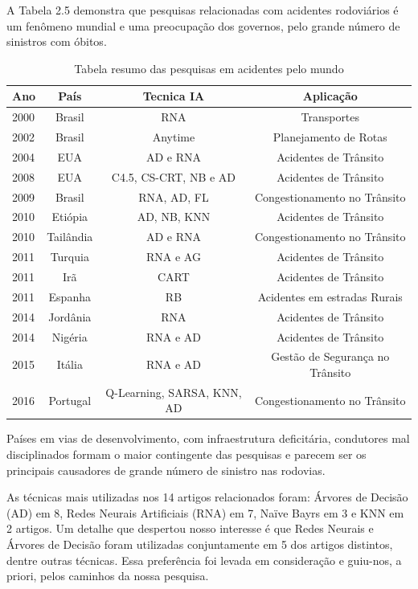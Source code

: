 \pagebreak

A Tabela 2.5 demonstra que pesquisas relacionadas com acidentes rodoviários é um fenômeno mundial e uma preocupação dos governos, pelo grande número de sinistros com  óbitos.

\begin{table}[!ht]
	\centering
	\caption{Tabela resumo das pesquisas em acidentes pelo mundo}
	\vspace{1mm}
	\begin{tabular}{l|c|c|c}
		\hline
		\textbf{Ano} & \textbf{País} & \textbf{Tecnica IA} & \textbf{Aplicação}\\
		\hline
		2000 & Brasil & RNA & Transportes\\
		2002 & Brasil & Anytime  & Planejamento de Rotas\\
		2004 & EUA & AD e RNA & Acidentes de Trânsito \\
		2008 & EUA & C4.5, CS-CRT, NB e AD & Acidentes de Trânsito\\
		2009 & Brasil & RNA, AD, FL  & Congestionamento no Trânsito\\
		2010 & Etiópia & AD, NB, KNN & Acidentes de Trânsito \\	
		2010 & Tailândia & AD e RNA & Congestionamento no Trânsito \\	
		2011 & Turquia & RNA e AG & Acidentes de Trânsito \\
		2011 & Irã & CART & Acidentes de Trânsito \\
		2011 & Espanha & RB & Acidentes em estradas Rurais \\		
		2014 & Jordânia & RNA & Acidentes de Trânsito \\
		2014 & Nigéria & RNA e AD & Acidentes de Trânsito \\		
		2015 & Itália & RNA e AD & Gestão de Segurança no Trânsito \\		
		2016 & Portugal & Q-Learning, SARSA, KNN, AD & Congestionamento no Trânsito\\
		
	\end{tabular}
\end{table}

Países em vias de desenvolvimento, com infraestrutura deficitária, condutores mal disciplinados formam o maior contingente das pesquisas e parecem ser os principais causadores de grande número de sinistro nas rodovias.

As técnicas mais utilizadas nos 14 artigos relacionados foram: Árvores de Decisão (AD) em 8, Redes Neurais Artificiais (RNA) em 7, Naïve Bayrs em 3 e KNN em 2 artigos. 
Um detalhe que despertou nosso interesse é que Redes Neurais e Árvores de Decisão foram utilizadas conjuntamente em 5 dos artigos distintos, dentre outras técnicas.
Essa preferência foi levada em consideração e guiu-nos, a priori, pelos caminhos da nossa pesquisa.